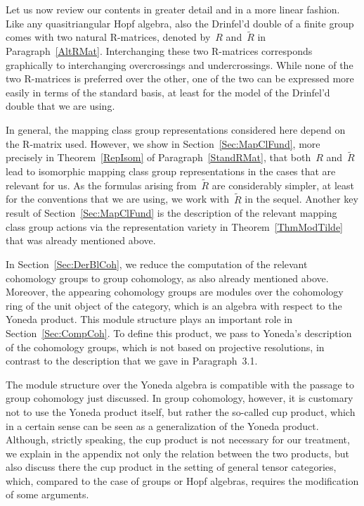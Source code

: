 \documentclass[12pt]{article}
\theoremstyle{definition}
\theoremstyle{break}
\renewcommand{\1}{\mathbbm{1}}
\begin{document}
Let us now review our contents in greater detail and in a more linear fashion. Like any quasitriangular Hopf algebra, also the Drinfel'd double of a finite group comes with two natural R-matrices, denoted by~$R$ and~$\tilde{R}$ in Paragraph~\ref{AltRMat}. Interchanging these two R-matrices corresponds graphically to interchanging overcrossings and undercrossings.  While none of the two R-matrices is preferred over the other, one of the two can be expressed more easily in terms of the standard basis, at least for the model of the Drinfel'd double that we are using.

In general, the mapping class group representations considered here depend on the R-matrix used. However, we show in Section~\ref{Sec:MapClFund}, more precisely in Theorem~\ref{RepIsom} of Paragraph~\ref{StandRMat}, that both~$R$ and~$\tilde{R}$ lead to isomorphic mapping class group representations in the cases that are relevant for us. As the formulas arising from~$\tilde{R}$ are considerably simpler, at least for the conventions that we are using, we work with~$\tilde{R}$ in the sequel. Another key result of Section~\ref{Sec:MapClFund} is the description of the relevant mapping class group actions via the representation variety in Theorem~\ref{ThmModTilde} that was already mentioned above.

In Section~\ref{Sec:DerBlCoh}, we reduce the computation of the relevant cohomology groups to group cohomology, as also already mentioned above. Moreover, the appearing cohomology groups are modules over the cohomology ring of the unit object of the category, which is an algebra with respect to the Yoneda product. This module structure plays an important role in Section~\ref{Sec:CompCoh}. To define this product, we pass to Yoneda's description of the cohomology groups, which is not based on projective resolutions, in contrast to the description that we gave in Paragraph~3.1.

\enlargethispage{-4mm}

The module structure over the Yoneda algebra is compatible with the passage to group cohomology just discussed. In group cohomology, however, it is customary not to use the Yoneda product itself, but rather the so-called cup product, which in a certain sense can be seen as a generalization of the Yoneda product. Although, strictly speaking, the cup product is not necessary for our treatment, we explain in the appendix not only the relation between the two products, but also discuss there the cup product in the setting of general tensor categories, which, compared to the case of groups or Hopf algebras, requires the modification of some arguments.
\end{document}

